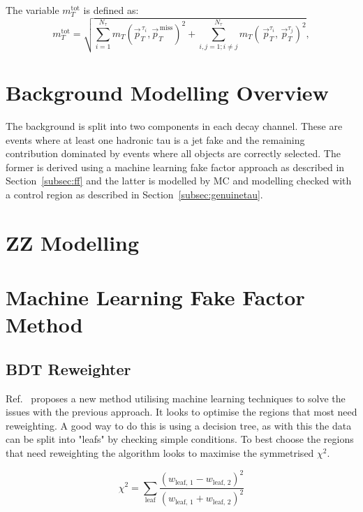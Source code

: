 The variable $m_{T}^{\text{tot}}$ is defined as:
\begin{equation}
m_{T}^{\text{tot}} = \sqrt{ \sum_{i=1}^{N_\tau} m_{T}(\vec{p}_{T}^{\hspace{2pt}\tau_i},\vec{p}_{T}^{\hspace{2pt}\text{miss}})^2 + \sum_{i,j=1; i \neq j}^{N_\tau} m_{T}(\hspace{2pt}\vec{p}_{T}^{\tau_i},\hspace{2pt}\vec{p}_{T}^{\tau_j})^2 },  
\end{equation}
 
\section{Background Modelling Overview}

The background is split into two components in each decay channel. These are events where at least one hadronic tau is a jet fake and the remaining contribution dominated by events where all objects are correctly selected. The former is derived using a machine learning fake factor approach as described in Section~\ref{subsec:ff} and the latter is modelled by MC and modelling checked with a control region as described in Section~\ref{subsec:genuinetau}.



\section{ZZ Modelling}
\section{Machine Learning Fake Factor Method}
\subsection{BDT Reweighter}

Ref.~\cite{Rogozhnikov:2016bdp} proposes a new method utilising machine learning techniques to solve the issues with the previous approach. It looks to optimise the regions that most need reweighting. A good way to do this is using a decision tree, as with this the data can be split into "leafs" by checking simple conditions. To best choose the regions that need reweighting the algorithm looks to maximise the symmetrised $\chi^2$.

\begin{equation}
\chi^2 = \sum_{\text{leaf}} \frac{(w_{\text{leaf, 1}}-w_{\text{leaf, 2}})^2}{(w_{\text{leaf, 1}}+w_{\text{leaf, 2}})^2}
\end{equation}

